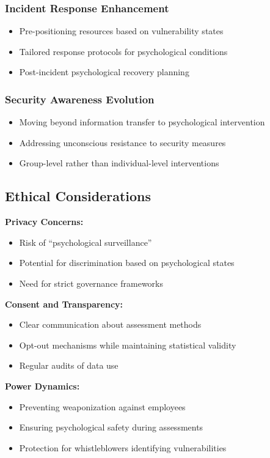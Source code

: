 \documentclass[11pt,a4paper]{article}
\begin{document}
\subsubsection{Incident Response Enhancement}
\begin{itemize}
\item Pre-positioning resources based on vulnerability states
\item Tailored response protocols for psychological conditions
\item Post-incident psychological recovery planning
\end{itemize}

\subsubsection{Security Awareness Evolution}
\begin{itemize}
\item Moving beyond information transfer to psychological intervention
\item Addressing unconscious resistance to security measures
\item Group-level rather than individual-level interventions
\end{itemize}

\subsection{Ethical Considerations}

\textbf{Privacy Concerns:}
\begin{itemize}
\item Risk of ``psychological surveillance''
\item Potential for discrimination based on psychological states
\item Need for strict governance frameworks
\end{itemize}

\textbf{Consent and Transparency:}
\begin{itemize}
\item Clear communication about assessment methods
\item Opt-out mechanisms while maintaining statistical validity
\item Regular audits of data use
\end{itemize}

\textbf{Power Dynamics:}
\begin{itemize}
\item Preventing weaponization against employees
\item Ensuring psychological safety during assessments
\item Protection for whistleblowers identifying vulnerabilities
\end{itemize}
\end{document}
